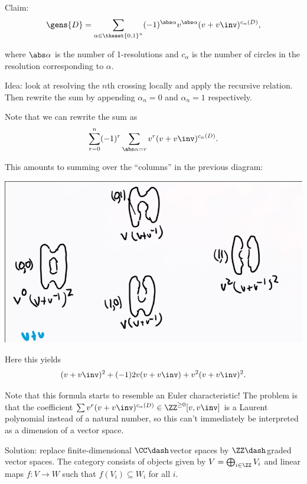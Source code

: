Claim: \begin{align*}
\gens{D} = \sum_{\alpha \in \theset{0, 1}^n} (-1)^{\abs \alpha}  v^{\abs \alpha} (v+v\inv)^{c_\alpha(D)}
,\end{align*}

where \(\abs \alpha\) is the number of 1-resolutions and \(c_\alpha\) is
the number of circles in the resolution corresponding to \(\alpha\).

\begin{description}
\tightlist
\item[Proof]
Idea: look at resolving the \(n\)th crossing locally and apply the
recursive relation. Then rewrite the sum by appending \(\alpha_n = 0\)
and \(\alpha_n = 1\) respectively.
\end{description}

Note that we can rewrite the sum as \begin{align*}
\sum_{r=0}^n (-1)^r \sum_{\abs \alpha = r} v^r (v+v\inv)^{c_\alpha(D)}
.\end{align*}

This amounts to summing over the ``columns'' in the previous diagram:

\includegraphics{figures/image_2020-07-07-11-22-49.png}

Here this yields \begin{align*}
(v+v\inv)^2 + (-1)2v(v+v\inv) + v^2 (v+v\inv)^2
.\end{align*}

Note that this formula starts to resemble an Euler characteristic! The
problem is that the coefficient
\(\sum v^r(v+v\inv)^{c_\alpha(D)} \in \ZZ^{\geq 0}[v, v\inv]\) is a
Laurent polynomial instead of a natural number, so this can't
immediately be interpreted as a dimension of a vector space.

Solution: replace finite-dimensional \(\CC\dash\)vector spaces by
\(\ZZ\dash\)graded vector spaces. The category consists of objects given
by \(V = \bigoplus_{i\in \ZZ} V_i\) and linear maps \(f:V\to W\) such
that \(f(V_i) \subseteq W_i\) for all \(i\).


